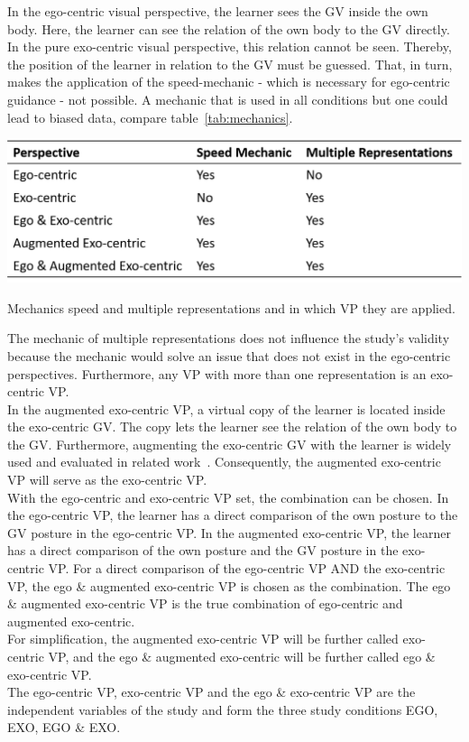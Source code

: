 In the ego-centric visual perspective, the learner sees the GV inside the own body. Here, the learner can see the relation of the own body to the GV directly. In the pure exo-centric visual perspective, this relation cannot be seen. Thereby, the position of the learner in relation to the GV must be guessed. That, in turn, makes the application of the speed-mechanic - which is necessary for ego-centric guidance - not possible. A mechanic that is used in all conditions but one could lead to biased data, compare table~\ref{tab:mechanics}.
\begin{table}[htb]
	\centering
	\includegraphics[width=\textwidth]{figures/mechanics_comparison.png}
	\caption[Mechanics for Motor Learing in Virtual Reality]{Mechanics speed and multiple representations and in which VP they are applied.}
	\label{tab:mechanics}
\end{table}
The mechanic of multiple representations does not influence the study's validity because the mechanic would solve an issue that does not exist in the ego-centric perspectives. Furthermore, any VP  with more than one representation is an exo-centric VP.\\
In the augmented exo-centric VP, a virtual copy of the learner is located inside the exo-centric GV. The copy lets the learner see the relation of the own body to the GV. Furthermore, augmenting the exo-centric GV with the learner is widely used and evaluated in related work~\cite{YouMove,thaichichua}. Consequently, the augmented exo-centric VP will serve as the exo-centric VP.\\
With the ego-centric and exo-centric VP set, the combination can be chosen. In the ego-centric VP, the learner has a direct comparison of the own posture to the GV posture in the ego-centric VP. In the augmented exo-centric VP, the learner has a direct comparison of the own posture and the GV posture in the exo-centric VP. For a direct comparison of the ego-centric VP AND the exo-centric VP, the ego \& augmented exo-centric VP is chosen as the combination. The ego \& augmented exo-centric VP is the true combination of ego-centric and augmented exo-centric.\\
For simplification, the augmented exo-centric VP will be further called exo-centric VP, and the ego \& augmented exo-centric will be further called ego \& exo-centric VP.\\
The ego-centric VP, exo-centric VP and the ego \& exo-centric VP are the independent variables of the study and form the three study conditions EGO, EXO, EGO \& EXO.

